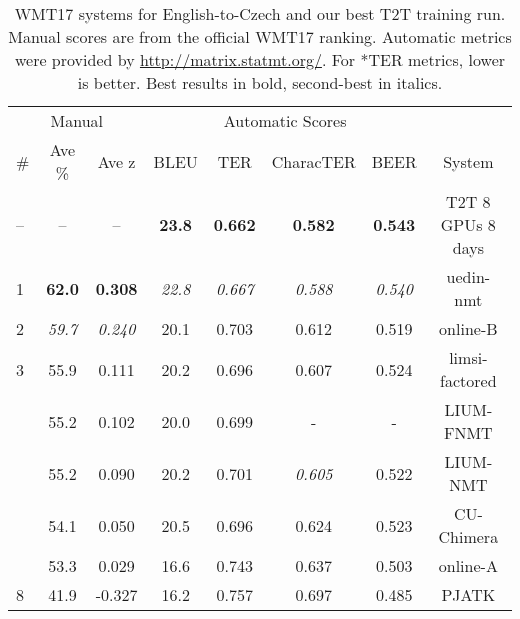 \documentclass{pbmlarxiv} \pdfoutput=1
\begin{document}
\begin{table}[t]
\def\fst#1{\bf #1}
\def\snd#1{\it #1}
\begin{center}
\footnotesize
\begin{tabular}{lcc|ccccc}
\multicolumn{3}{c|}{Manual} & \multicolumn{4}{c}{Automatic Scores} \\
\#    	& Ave \%    	& Ave z      	& BLEU      	& TER        	& CharacTER  	& BEER       	& System \\
\hline
     -- &         --    &         --    & \fst{23.8}    & \fst{0.662}   & \fst{0.582}   & \fst{0.543}   & T2T 8 GPUs 8 days\\ %
\hline
     1	& \fst{62.0}	& \fst{0.308}	& \snd{22.8}	& \snd{0.667}	& \snd{0.588}	& \snd{0.540}	& uedin-nmt \\
\hline
     2	& \snd{59.7}	& \snd{0.240}	&       20.1	&       0.703	&       0.612	&       0.519	& online-B \\
\hline
     3	&       55.9	&       0.111	&       20.2	&     {0.696}	&       0.607	&     {0.524}	& limsi-factored \\
      	&       55.2	&       0.102	&       20.0	&       0.699	& -          	& -          	& LIUM-FNMT \\
      	&       55.2	&       0.090	&       20.2	&       0.701	& \snd{0.605}	&       0.522	& LIUM-NMT \\
      	&       54.1	&       0.050	&     {20.5}	&     {0.696}	&       0.624	&       0.523	& CU-Chimera \\
      	&       53.3	&       0.029	&       16.6	&       0.743	&       0.637	&       0.503	& online-A \\
\hline
     8	&       41.9	&      -0.327	&       16.2	&       0.757	&       0.697	&       0.485	& PJATK \\
\end{tabular}
\caption{WMT17 systems for English-to-Czech and our best T2T training run. Manual scores are from the official WMT17 ranking.
Automatic metrics were provided by \protect\url{http://matrix.statmt.org/}. For *TER
metrics, lower is better. Best results in bold, second-best in italics.}
\label{tab:wmt17results}
\end{center}
\end{table}
\end{document}
